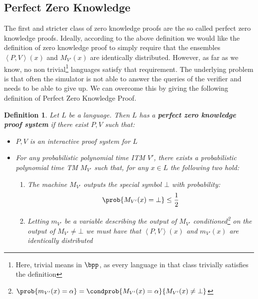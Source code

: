 \documentclass{article}
\newtheorem{definition}{Definition}
\begin{document}
\subsection{Perfect Zero Knowledge}
The first and stricter class of zero knowledge proofs are the so called perfect zero knowledge proofs. Ideally, according to the above definition we would like the definition of zero knowledge proof to simply require that the ensembles $\left<P, V\right>(x)$ and $M_{V'}(x)$ are identically distributed. However, as far as we know, no non trivial\footnote{Here, trivial means in $\bpp$, as every language in that class trivially satisfies the definition} languages satisfy that requirement. The underlying problem is that often the simulator is not able to answer the queries of the verifier and needs to be able to give up. We can overcome this by giving the following definition of Perfect Zero Knowledge Proof.
\begin{definition}
    Let $L$ be a language. Then $L$ has a \textbf{perfect zero knowledge proof system} if there exist $P, V$ such that:
    \begin{itemize}
        \item $P, V$ is an interactive proof system for $L$
        \item For any probabilistic polynomial time ITM $V'$, there exists a probabilistic polynomial time TM $M_{V'}$ such that, for any $x \in L$ the following two hold:
              \begin{enumerate}
                  \item The machine $M_{V'}$ outputs the special symbol $\bot$ with probability: \[\prob{M_{V'}(x) = \bot} \leq \frac{1}{2}\]
                  \item Letting $m_{V'}$ be a variable describing the output of $M_{V'}$ conditioned\footnote{$\prob{m_{V'}(x) = \alpha} = \condprob{M_{V'}(x) = \alpha}{M_{V'}(x) \neq \bot}$} on the output of $M_{V'} \neq \bot$  we must have that $\left<P, V\right>(x)$ and $m_{V'}(x)$ are identically distributed
              \end{enumerate}
    \end{itemize}
\end{definition}
\end{document}
